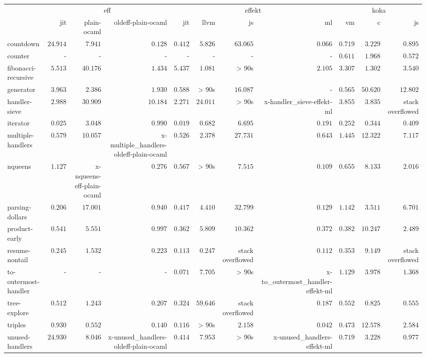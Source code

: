 \begin{tabular}{l r r r r r r r r r r}
\toprule & \multicolumn{3}{c}{eff} & \multicolumn{4}{c}{effekt} & \multicolumn{3}{c}{koka} \\
\cmidrule(l){2-4}\cmidrule(l){5-8}\cmidrule(l){9-11} 
 & jit & plain-ocaml & oldeff-plain-ocaml & jit & llvm & js & ml & vm & c & js \\
\midrule
countdown & $24.914$ & $7.941$ & $0.128$ & $0.412$ & $5.826$ & $63.065$ & $\mathbf{0.066}$ & $0.719$ & $3.229$ & $0.895$ \\
counter & - & - & - & - & - & - & - & $0.611$ & $1.968$ & $\mathbf{0.572}$ \\
fibonacci-recursive & $5.513$ & $40.176$ & $1.434$ & $5.437$ & $\mathbf{1.081}$ & > 90s & $2.105$ & $3.307$ & $1.302$ & $3.540$ \\
generator & $3.963$ & $2.386$ & $1.930$ & $0.588$ & > 90s & $16.087$ & - & $\mathbf{0.565}$ & $50.620$ & $12.802$ \\
handler-sieve & $2.988$ & $30.909$ & $10.184$ & $\mathbf{2.271}$ & $24.011$ & > 90s & x-handler_sieve-effekt-ml & $3.855$ & $3.835$ & stack overflowed \\
iterator & $0.025$ & $3.048$ & $0.990$ & $\mathbf{0.019}$ & $0.682$ & $6.695$ & $0.191$ & $0.252$ & $0.344$ & $0.409$ \\
multiple-handlers & $0.579$ & $10.057$ & x-multiple_handlers-oldeff-plain-ocaml & $\mathbf{0.526}$ & $2.378$ & $27.731$ & $0.643$ & $1.445$ & $12.322$ & $7.117$ \\
nqueens & $1.127$ & x-nqueens-eff-plain-ocaml & $0.276$ & $0.567$ & > 90s & $7.515$ & $\mathbf{0.109}$ & $0.655$ & $8.133$ & $2.016$ \\
parsing-dollars & $0.206$ & $17.001$ & $0.940$ & $0.417$ & $4.410$ & $32.799$ & $\mathbf{0.129}$ & $1.142$ & $3.511$ & $6.701$ \\
product-early & $0.541$ & $5.551$ & $0.997$ & $\mathbf{0.362}$ & $5.809$ & $10.362$ & $0.372$ & $0.382$ & $10.247$ & $2.489$ \\
resume-nontail & $0.245$ & $1.532$ & $0.223$ & $0.113$ & $0.247$ & stack overflowed & $\mathbf{0.112}$ & $0.353$ & $9.149$ & stack overflowed \\
to-outermost-handler & - & - & - & $\mathbf{0.071}$ & $7.705$ & > 90s & x-to_outermost_handler-effekt-ml & $1.129$ & $3.978$ & $1.368$ \\
tree-explore & $0.512$ & $1.243$ & $0.207$ & $0.324$ & $59.646$ & stack overflowed & $\mathbf{0.187}$ & $0.552$ & $0.825$ & $0.555$ \\
triples & $0.930$ & $0.552$ & $0.140$ & $0.116$ & > 90s & $2.158$ & $\mathbf{0.042}$ & $0.473$ & $12.578$ & $2.584$ \\
unused-handlers & $24.930$ & $8.046$ & x-unused_handlers-oldeff-plain-ocaml & $\mathbf{0.414}$ & $7.953$ & > 90s & x-unused_handlers-effekt-ml & $0.719$ & $3.228$ & $0.977$ \\
\bottomrule
\end{tabular}